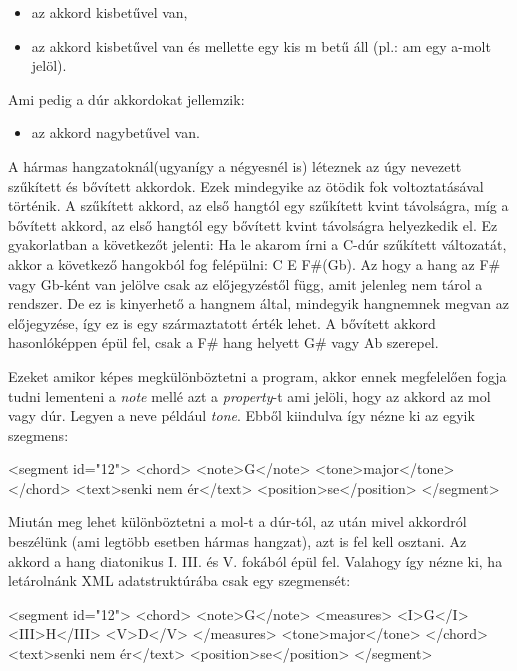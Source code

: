 \begin{itemize}
	\item az akkord kisbetűvel van,
	\item az akkord kisbetűvel van és mellette egy kis m betű áll (pl.: am egy a-molt jelöl).
\end{itemize}
Ami pedig a dúr akkordokat jellemzik:
\begin{itemize}
	\item az akkord nagybetűvel van.
\end{itemize}
A hármas hangzatoknál(ugyanígy a négyesnél is) léteznek az úgy nevezett szűkített és bővített akkordok. Ezek mindegyike az ötödik fok voltoztatásával történik. A szűkített akkord, az első hangtól egy szűkített kvint távolságra, míg a bővített akkord, az első hangtól egy bővített kvint távolságra helyezkedik el. Ez gyakorlatban a következőt jelenti:
Ha le akarom írni a C-dúr szűkített változatát, akkor a következő hangokból fog felépülni: C E F\#(Gb).
Az hogy a hang az F\# vagy Gb-ként van jelölve csak az előjegyzéstől függ, amit jelenleg nem tárol a rendszer. De ez is kinyerhető a hangnem által, mindegyik hangnemnek megvan az előjegyzése, így ez is egy származtatott érték lehet. A bővített akkord hasonlóképpen épül fel, csak a F\# hang helyett G\# vagy Ab szerepel.

Ezeket amikor képes megkülönböztetni a program, akkor ennek megfelelően fogja tudni lementeni a \textit{note} mellé azt a \textit{property}-t ami jelöli, hogy az akkord az mol vagy dúr. Legyen a neve például \textit{tone}. Ebből kiindulva így nézne ki az egyik szegmens:
\begin{xml}
<segment id="12">
   <chord>
      <note>G</note>
      <tone>major</tone>
   </chord>
   <text>senki nem ér</text>
   <position>se</position>
</segment>
\end{xml}

Miután meg lehet különböztetni a mol-t a dúr-tól, az után mivel akkordról beszélünk (ami legtöbb esetben hármas hangzat), azt is fel kell osztani. Az akkord a hang diatonikus I. III. és V. fokából épül fel. Valahogy így nézne ki, ha letárolnánk XML adatstruktúrába csak egy szegmensét:
\begin{xml}
<segment id="12">
   <chord>
      <note>G</note>
      <measures>
         <I>G</I>
         <III>H</III>
         <V>D</V>
      </measures>
      <tone>major</tone>
   </chord>
   <text>senki nem ér</text>
   <position>se</position>
</segment>
\end{xml}

